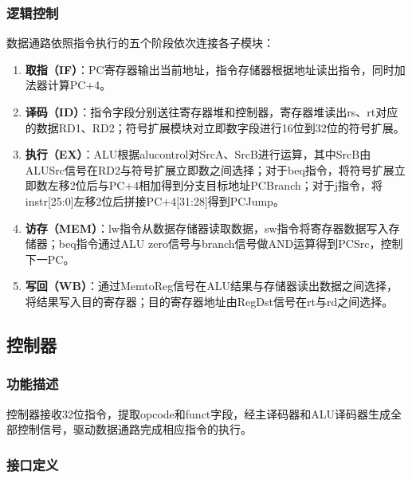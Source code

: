 \subsubsection{逻辑控制}
数据通路依照指令执行的五个阶段依次连接各子模块：
\begin{enumerate}[(1)]
    \item \textbf{取指（IF）}：PC寄存器输出当前地址，指令存储器根据地址读出指令，同时加法器计算PC+4。
    \item \textbf{译码（ID）}：指令字段分别送往寄存器堆和控制器，寄存器堆读出rs、rt对应的数据RD1、RD2；符号扩展模块对立即数字段进行16位到32位的符号扩展。
    \item \textbf{执行（EX）}：ALU根据alucontrol对SrcA、SrcB进行运算，其中SrcB由ALUSrc信号在RD2与符号扩展立即数之间选择；对于beq指令，将符号扩展立即数左移2位后与PC+4相加得到分支目标地址PCBranch；对于j指令，将instr[25:0]左移2位后拼接PC+4[31:28]得到PCJump。
    \item \textbf{访存（MEM）}：lw指令从数据存储器读取数据，sw指令将寄存器数据写入存储器；beq指令通过ALU zero信号与branch信号做AND运算得到PCSrc，控制下一PC。
    \item \textbf{写回（WB）}：通过MemtoReg信号在ALU结果与存储器读出数据之间选择，将结果写入目的寄存器；目的寄存器地址由RegDst信号在rt与rd之间选择。
\end{enumerate}

\subsection{控制器}\label{sub:controller}

\subsubsection{功能描述}
控制器接收32位指令，提取opcode和funct字段，经主译码器和ALU译码器生成全部控制信号，驱动数据通路完成相应指令的执行。

\subsubsection{接口定义}

